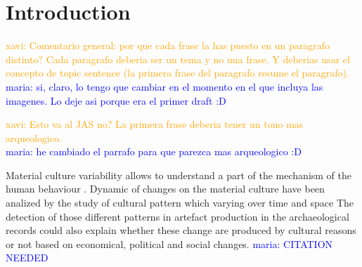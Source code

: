 \documentclass[review]{elsarticle}
\newcommand{\memo}[2]{\textcolor{#1}{#2}}
\newcommand{\xavi}[1]{\memo{orange}{xavi: #1\\}}
\newcommand{\maria}[1]{\memo{blue}{maria: #1\\}}
\begin{document}



\section{Introduction}

\xavi{Comentario general: por que cada frase la has puesto en un paragrafo distinto? Cada paragrafo deberia ser un tema y no una frase. Y deberias usar el concepto de topic sentence (la primera frase del paragrafo resume el paragrafo).}
\maria{si, claro, lo tengo que cambiar en el momento en el que incluya las imagenes. Lo deje asi porque era el primer draft :D}


\xavi{Esto va al JAS no? La primera frase deberia tener un tono mas arqueologico.}
\maria{he cambiado el parrafo para que parezca mas arqueologico :D}

  

Material culture variability allows to understand a part of the mechanism of the human behaviour \citep{basalla1988evolution, schillinger_copying_2016}. Dynamic of changes on the material culture have been analized by the study of cultural pattern which varying over time and space \citep{eerkens_jelmer_cultural_2007, lycett_cultural_2015} The detection of those  different patterns in artefact production in the archaeological records could also explain whether these change are produced by cultural reasons or not based on economical, political and social changes. \maria{CITATION NEEDED}
\end{document}
